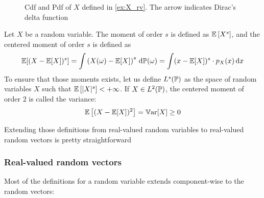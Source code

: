 \documentclass[../../Main_ManuscritThese.tex]{subfiles}
\begin{document}
\begin{figure}[!h]
  \centering
  
  \caption{Cdf and Pdf of $X$ defined in \cref{ex:X_rv}. The arrow indicates Dirac's delta function}
  \label{fig:example_pdf_cdf}
\end{figure}

\begin{definition}
  Let $X$ be a random variable.
  The moment of order $s$ is defined as $\mathbb{E}\left[X^s\right]$, and the centered moment of order $s$ is defined as
  \begin{equation}
    \mathbb{E}[(X-\mathbb{E}[X])^s]=\int \left(X(\omega) - \mathbb{E}[X]\right)^s \,\mathrm{d}\mathbb{P}(\omega) = \int (x-\mathbb{E}[X])^s\cdot p_X(x)\,\mathrm{d}x
  \end{equation}
  To ensure that those moments exists, let us define $L^s(\mathbb{P})$ as the space of random variables $X$ such that $\mathbb{E}\left[\lvert X \rvert^s\right] < +\infty$.
  If $X\in L^2(\mathbb{P})$, the centered moment of order $2$ is called the variance:
  \begin{equation}
    \label{eq:variance_def}
    \mathbb{E}\left[(X-\mathbb{E}[X])^2 \right] = \mathbb{V}\mathrm{ar}[X] \geq 0
  \end{equation}
\end{definition}


Extending those definitions from real-valued random variables to real-valued random vectors is pretty straightforward

\subsubsection{Real-valued random vectors}
 Most of the definitions for a random variable extends component-wise to the random vectors:
\end{document}
